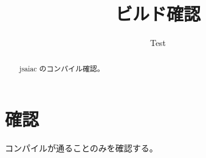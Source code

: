 \documentclass[twocolumn]{jsaiac}
\title{ビルド確認}
\author{%
  Test\\
  \jaddress{神戸大学, test@example.ac.jp}%
}
\begin{document}
\maketitle
\begin{abstract}
jsaiac のコンパイル確認。
\end{abstract}
\section{確認}
コンパイルが通ることのみを確認する。
\end{document}
